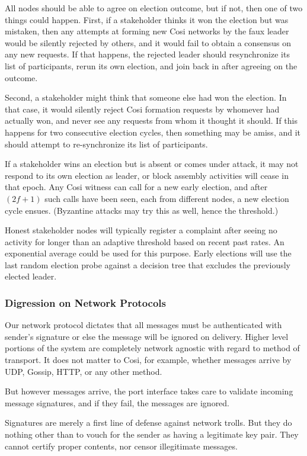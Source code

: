 \documentclass{yellowpaper}
\begin{document}
All nodes should be able to agree on election outcome, but if not, then one of two things could happen. First, if a stakeholder thinks it won the election but was mistaken, then any attempts at forming new Cosi networks by the faux leader would be silently rejected by others, and it would fail to obtain a consensus on any new requests. If that happens, the rejected leader should resynchronize its list of participants, rerun its own election, and join back in after agreeing on the outcome. 

Second, a stakeholder might think that someone else had won the election. In that case, it would silently reject Cosi formation requests by whomever had actually won, and never see any requests from whom it thought it should. If this happens for two consecutive election cycles, then something may be amiss, and it should attempt to re-synchronize its list of participants.

If a stakeholder wins an election but is absent or comes under attack, it may not respond to its own election as leader, or block assembly activities will cease in that epoch. Any Cosi witness can call for a new early election, and after $(2 f+1)$ such calls have been seen, each from different nodes, a new election cycle ensues. (Byzantine attacks may try this as well, hence the threshold.)

Honest stakeholder nodes will typically register a complaint after seeing no activity for longer than an adaptive threshold based on recent past rates. An exponential average could be used for this purpose. Early elections will use the last random election probe against a decision tree that excludes the previously elected leader.

\subsubsection{Digression on Network Protocols}
Our network protocol dictates that all messages must be authenticated with sender's signature or else the message will be ignored on delivery. Higher level portions of the system are completely network agnostic with regard to method of transport. It does not matter to Cosi, for example, whether messages arrive by UDP, Gossip, HTTP, or any other method.

But however messages arrive, the port interface takes care to validate incoming message signatures, and if they fail, the messages are ignored. 

Signatures are merely a first line of defense against network trolls. But they do nothing other than to vouch for the sender as having a legitimate key pair. They cannot certify proper contents, nor censor illegitimate messages. 
\end{document}
